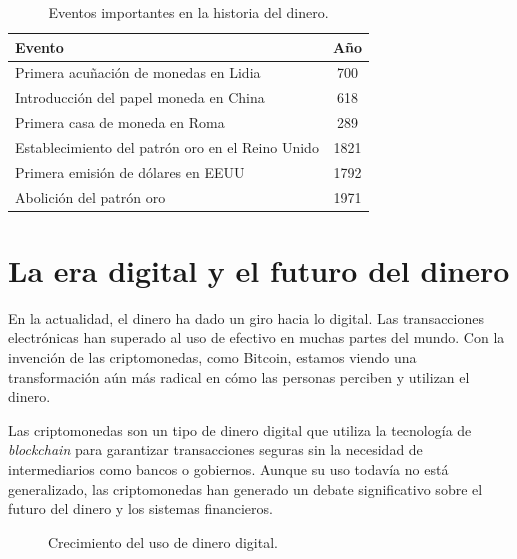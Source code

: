 \begin{table}[!ht]
\sf\footnotesize\setlength\tabcolsep{4pt}
\centering
\begin{tabular}{l | S[table-format=4.0]}
\toprule
\textbf{Evento} & \textbf{Año} \\
\midrule
Primera acuñación de monedas en Lidia & 700 \\
\midrule
Introducción del papel moneda en China & 618 \\
\midrule
Primera casa de moneda en Roma & 289 \\
\midrule
Establecimiento del patrón oro en el Reino Unido & 1821 \\
\midrule
Primera emisión de dólares en EEUU & 1792 \\
\midrule
Abolición del patrón oro & 1971 \\
\bottomrule
\end{tabular}
\caption{Eventos importantes en la historia del dinero.}\label{moneyhistory}
\end{table}

\section{La era digital y el futuro del dinero}

En la actualidad, el dinero ha dado un giro hacia lo digital. Las transacciones electrónicas han superado al uso de efectivo en muchas partes del mundo. Con la invención de las criptomonedas, como Bitcoin, estamos viendo una transformación aún más radical en cómo las personas perciben y utilizan el dinero.

Las criptomonedas son un tipo de dinero digital que utiliza la tecnología de \textit{blockchain} para garantizar transacciones seguras sin la necesidad de intermediarios como bancos o gobiernos. Aunque su uso todavía no está generalizado, las criptomonedas han generado un debate significativo sobre el futuro del dinero y los sistemas financieros.

\begin{figure}[!ht]
\begin{mdframed}[backgroundcolor=gray!5,linewidth=0.5pt]
\centering
{}
\end{mdframed}
\caption{Crecimiento del uso de dinero digital.}\label{monedas}
\end{figure}

